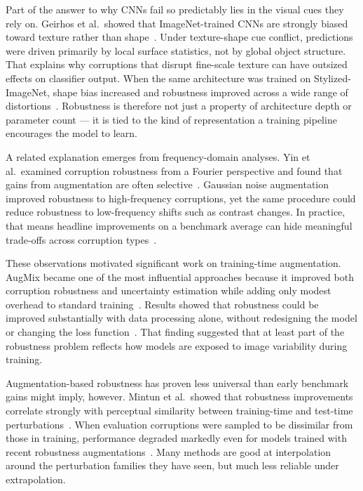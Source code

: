 \documentclass[conference]{IEEEtran}
\begin{document}
Part of the answer to why CNNs fail so predictably lies in the visual cues they rely on. Geirhos et al.\ showed that ImageNet-trained CNNs are strongly biased toward texture rather than shape~\cite{geirhos2019}. Under texture-shape cue conflict, predictions were driven primarily by local surface statistics, not by global object structure. That explains why corruptions that disrupt fine-scale texture can have outsized effects on classifier output. When the same architecture was trained on Stylized-ImageNet, shape bias increased and robustness improved across a wide range of distortions~\cite{geirhos2019}. Robustness is therefore not just a property of architecture depth or parameter count --- it is tied to the kind of representation a training pipeline encourages the model to learn.

A related explanation emerges from frequency-domain analyses. Yin et al.\ examined corruption robustness from a Fourier perspective and found that gains from augmentation are often selective~\cite{yin2019}. Gaussian noise augmentation improved robustness to high-frequency corruptions, yet the same procedure could reduce robustness to low-frequency shifts such as contrast changes. In practice, that means headline improvements on a benchmark average can hide meaningful trade-offs across corruption types~\cite{yin2019}.

These observations motivated significant work on training-time augmentation. AugMix became one of the most influential approaches because it improved both corruption robustness and uncertainty estimation while adding only modest overhead to standard training~\cite{hendrycks2020}. Results showed that robustness could be improved substantially with data processing alone, without redesigning the model or changing the loss function~\cite{hendrycks2020}. That finding suggested that at least part of the robustness problem reflects how models are exposed to image variability during training.

Augmentation-based robustness has proven less universal than early benchmark gains might imply, however. Mintun et al.\ showed that robustness improvements correlate strongly with perceptual similarity between training-time and test-time perturbations~\cite{mintun2021}. When evaluation corruptions were sampled to be dissimilar from those in training, performance degraded markedly even for models trained with recent robustness augmentations~\cite{mintun2021}. Many methods are good at interpolation around the perturbation families they have seen, but much less reliable under extrapolation.
\end{document}
